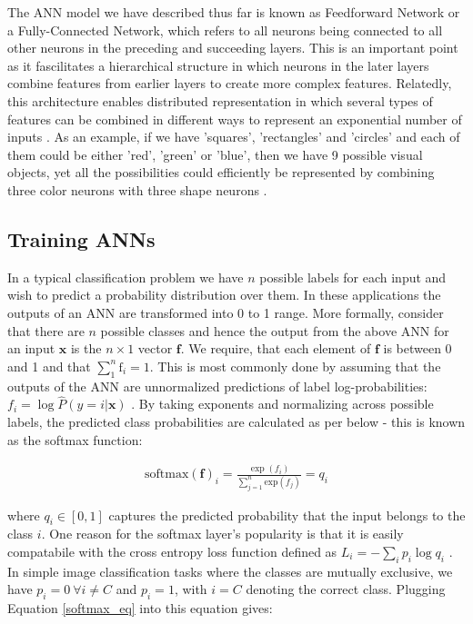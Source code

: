\documentclass[12pt]{report}
\begin{document}
The ANN model we have described thus far is known as Feedforward Network or a Fully-Connected Network, which refers to all neurons being connected to all other neurons in the preceding and succeeding layers. This is an important point as it fascilitates a hierarchical structure in which neurons in the later layers combine features from earlier layers to create more complex features. Relatedly, this architecture enables distributed representation in which several types of features can be combined in different ways to represent an exponential number of inputs \cite{Hinton1985}. As an example, if we have 'squares', 'rectangles' and 'circles' and each of them could be either 'red', 'green' or 'blue', then we have 9 possible visual objects, yet all the possibilities could efficiently be represented by combining three color neurons with three shape neurons \cite{Goodfellow2016}. 

\subsection{Training ANNs}

In a typical classification problem we have $n$ possible labels for each input and wish to predict a probability distribution over them. In these applications the outputs of an ANN are transformed into 0 to 1 range. More formally, consider that there are $n$ possible classes and hence the output from the above ANN for an input $\mathbf{x}$ is the $n \times 1$ vector $\mathbf{f}$. We require, that each element of $\mathbf{f}$ is between 0 and 1 and that $\sum_1^n \text{f}_i = 1$. This is most commonly done by assuming that the outputs of the ANN are unnormalized predictions of label log-probabilities: $f_i = \log \hat{P}(y = i | \mathbf{x})$ \cite{Goodfellow2016}. By taking exponents and normalizing across possible labels, the predicted class probabilities are calculated as per below - this is known as the softmax function:

\begin{align} \label{softmax_eq}
  \text{softmax}(\mathbf{f})_i = \frac{\exp (f_i)}{\sum_{j=1}^n \text{exp}(f_j)}=q_i
\end{align}

where $q_i \in [0,1]$ captures the predicted probability that the input belongs to the class $i$. One reason for the softmax layer's popularity is that it is easily compatabile with the cross entropy loss function defined as $L_i=-\sum_i p_i \log q_i$ \cite{Shannon1948}. In simple image classification tasks where the classes are mutually exclusive, we have $p_i=0 \ \forall i\ne C$ and $p_i=1$, with $i=C$ denoting the correct class. Plugging Equation \ref{softmax_eq} into this equation gives:
\end{document}
